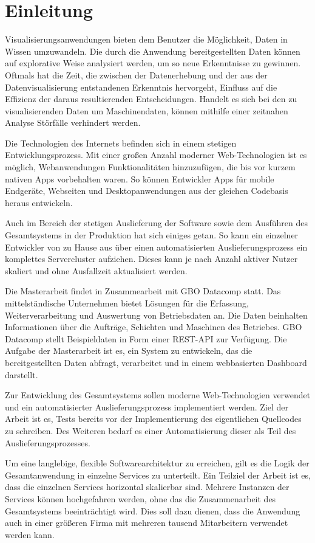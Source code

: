 \chapter{Einleitung}
\label{chap:einleitung}
Visualisierungsanwendungen bieten dem Benutzer die Möglichkeit,
Daten in Wissen umzuwandeln. Die durch die Anwendung bereitgestellten
Daten können auf explorative Weise analysiert werden, um so neue
Erkenntnisse zu gewinnen. Oftmals hat die Zeit, die zwischen der 
Datenerhebung und der aus der Datenvisualisierung entstandenen Erkenntnis
hervorgeht, Einfluss auf die Effizienz der daraus resultierenden Entscheidungen.
Handelt es sich bei den zu visualisierenden Daten um Maschinendaten,
können mithilfe einer zeitnahen Analyse Störfälle verhindert werden.

Die Technologien des Internets befinden sich in einem stetigen Entwicklungsprozess.
Mit einer großen Anzahl moderner Web-Technologien ist es möglich, Webanwendungen Funktionalitäten
hinzuzufügen, die bis vor kurzem nativen Apps vorbehalten waren. So können Entwickler
Apps für mobile Endgeräte, Webseiten und Desktopanwendungen aus der gleichen Codebasis
heraus entwickeln.

Auch im Bereich der stetigen Auslieferung der Software sowie dem Ausführen des Gesamtsystems in der 
Produktion hat sich einiges getan. So kann ein einzelner Entwickler von zu Hause aus über einen automatisierten 
Auslieferungsprozess ein komplettes Servercluster aufziehen. Dieses kann je nach Anzahl aktiver Nutzer skaliert
und ohne Ausfallzeit aktualisiert werden.

Die Masterarbeit findet in Zusammearbeit mit GBO Datacomp statt.
Das mittelständische Unternehmen bietet Lösungen für die Erfassung,
Weiterverarbeitung und Auswertung von Betriebsdaten an. Die Daten
beinhalten Informationen über die Aufträge, Schichten und Maschinen
des Betriebes. GBO Datacomp stellt Beispieldaten in Form einer REST-API
zur Verfügung. Die Aufgabe der Masterarbeit ist es, ein System zu entwickeln,
das die bereitgestellten Daten abfragt, verarbeitet und in einem webbasierten
Dashboard darstellt. 

Zur Entwicklung des Gesamtsystems sollen moderne Web-Technologien verwendet
und ein automatisierter Auslieferungsprozess implementiert werden. Ziel der Arbeit ist es,
Tests bereits vor der Implementierung des eigentlichen Quellcodes zu schreiben. Des Weiteren 
bedarf es einer Automatisierung dieser als Teil des Auslieferungsprozesses. 

Um eine langlebige, flexible Softwarearchitektur zu erreichen, gilt es die Logik
der Gesamtanwendung in einzelne Services zu unterteilt. Ein Teilziel der Arbeit
ist es, dass die einzelnen Services horizontal skalierbar sind. Mehrere Instanzen
der Services können hochgefahren werden, ohne das die Zusammenarbeit
des Gesamtsystems beeinträchtigt wird. Dies soll dazu dienen, dass die Anwendung
auch in einer größeren Firma mit mehreren tausend Mitarbeitern verwendet werden kann.

